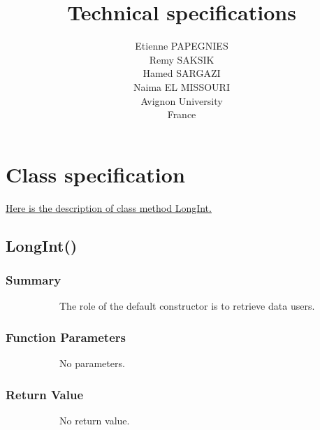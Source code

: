 \documentclass[11pt]{report}
\begin{document}
    \title{Technical specifications}
    \author { 
    Etienne PAPEGNIES\\
    Remy SAKSIK\\
    Hamed SARGAZI\\
    Naima EL MISSOURI\\
    Avignon University\\
    France\\
}
   \maketitle

 \setcounter{tocdepth}{1}



    \tableofcontents
    
   \chapter*{Class specification}  
   
	\begin{bf}\underline{Here is the description of class method LongInt.}\end{bf}
    \section{LongInt()}
	\subsection{Summary}
~~~~~~~~~~~The role of the default constructor is to retrieve data users.
	\subsection{Function Parameters}
~~~~~~~~~~~No parameters.
	\subsection{Return Value}
~~~~~~~~~~~No return value.
	    
\end{document}
